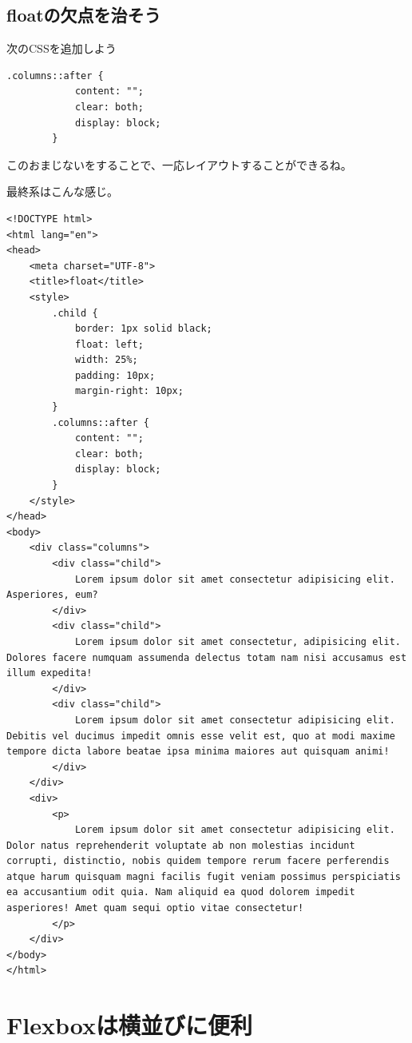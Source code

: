 \documentclass[mingoth,11pt,a4j,uplatex,dvipdfmx]{jsarticle}
\begin{document}
\subsection{floatの欠点を治そう}
次のCSSを追加しよう
\begin{lstlisting}[caption=CSS部分2]
        .columns::after {
            content: "";
            clear: both;
            display: block;
        }
\end{lstlisting}
このおまじないをすることで、一応レイアウトすることができるね。

最終系はこんな感じ。
\begin{lstlisting}[caption=CSS部分1]
<!DOCTYPE html>
<html lang="en">
<head>
    <meta charset="UTF-8">
    <title>float</title>
    <style>
        .child {
            border: 1px solid black;
            float: left;
            width: 25%;
            padding: 10px;
            margin-right: 10px;
        }
        .columns::after {
            content: "";
            clear: both;
            display: block;
        }
    </style>
</head>
<body>
    <div class="columns">
        <div class="child">
            Lorem ipsum dolor sit amet consectetur adipisicing elit. Asperiores, eum?
        </div>
        <div class="child">
            Lorem ipsum dolor sit amet consectetur, adipisicing elit. Dolores facere numquam assumenda delectus totam nam nisi accusamus est illum expedita!
        </div>
        <div class="child">
            Lorem ipsum dolor sit amet consectetur adipisicing elit. Debitis vel ducimus impedit omnis esse velit est, quo at modi maxime tempore dicta labore beatae ipsa minima maiores aut quisquam animi!
        </div>
    </div>
    <div>
        <p>
            Lorem ipsum dolor sit amet consectetur adipisicing elit. Dolor natus reprehenderit voluptate ab non molestias incidunt corrupti, distinctio, nobis quidem tempore rerum facere perferendis atque harum quisquam magni facilis fugit veniam possimus perspiciatis ea accusantium odit quia. Nam aliquid ea quod dolorem impedit asperiores! Amet quam sequi optio vitae consectetur!
        </p>
    </div>
</body>
</html>
\end{lstlisting}


\section{Flexboxは横並びに便利}
\end{document}

